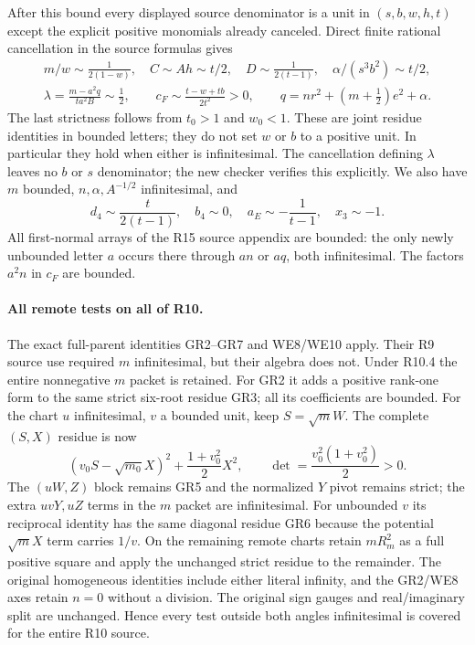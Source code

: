 After this bound every displayed source denominator is a unit in
$(s,b,w,h,t)$ except the explicit positive monomials already canceled.
Direct finite rational cancellation in the source formulas gives
\[
 \begin{gathered}
 m/w\sim\frac1{2(1-w)},\quad
 C\sim Ah\sim t/2,\quad D\sim\frac1{2(t-1)},\quad
 \alpha/(s^3b^2)\sim t/2,\\
 \lambda=\frac{m-a^2q}{ta^2B}\sim\frac12,\qquad
 c_F\sim\frac{t-w+tb}{2t^2}>0,\qquad
 q=nr^2+(m+\tfrac12)e^2+\alpha.
 \end{gathered}
\tag{R10.4}
\]
The last strictness follows from $t_0>1$ and $w_0<1$.
These are joint residue identities in bounded letters; they do not
set $w$ or $b$ to a positive unit. In particular they hold when either
is infinitesimal. The cancellation defining $\lambda$ leaves no $b$
or $s$ denominator; the new checker verifies this explicitly.
We also have $m$ bounded, $n,\alpha,A^{-1/2}$ infinitesimal, and
\[
 d_4\sim\frac{t}{2(t-1)},\quad b_4\sim0,\quad
 a_E\sim-\frac1{t-1},\quad x_3\sim-1.
\tag{R10.5}
\]
All first-normal arrays of the R15 source appendix are bounded:
the only newly unbounded letter $a$ occurs there through $an$ or
$aq$, both infinitesimal. The factors $a^2n$ in $c_F$ are bounded.

\paragraph{All remote tests on all of R10.}
The exact full-parent identities GR2--GR7 and WE8/WE10 apply.
Their R9 source use required $m$ infinitesimal, but their algebra does
not. Under R10.4 the entire nonnegative $m$ packet is retained.
For GR2 it adds a positive rank-one form to the same strict six-root
residue GR3; all its coefficients are bounded. For the chart
$u$ infinitesimal, $v$ a bounded unit, keep $S=\sqrt m W$.
The complete $(S,X)$ residue is now
\[
 (v_0S-\sqrt{m_0}X)^2+\frac{1+v_0^2}{2}X^2,
 \qquad \det=\frac{v_0^2(1+v_0^2)}2>0.
\tag{R10.6}
\]
The $(uW,Z)$ block remains GR5 and the normalized $Y$ pivot remains
strict; the extra $uvY,uZ$ terms in the $m$ packet are infinitesimal.
For unbounded $v$ its reciprocal identity has the same diagonal
residue GR6 because the potential $\sqrt m X$ term carries $1/v$.
On the remaining remote charts retain $mR_m^2$ as a full positive
square and apply the unchanged strict residue to the remainder.
The original homogeneous identities include either literal infinity,
and the GR2/WE8 axes retain $n=0$ without a division. The original
sign gauges and real/imaginary split are unchanged. Hence every test
outside both angles infinitesimal is covered for the entire R10 source.

